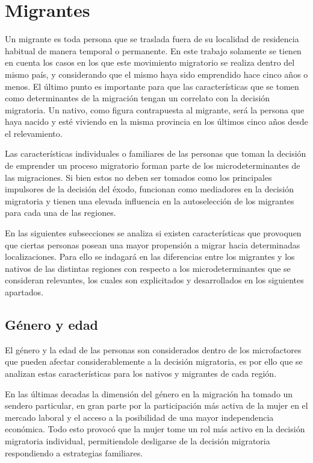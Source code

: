 \documentclass[12pt,a4paper]{article}
\begin{document}
\section{Migrantes}
Un migrante es toda persona que se traslada fuera de su localidad de residencia habitual de manera temporal o permanente. En este trabajo solamente se tienen en cuenta los casos en los que este movimiento migratorio se realiza dentro del mismo país, y considerando que el mismo haya sido emprendido hace cinco años o menos. El último punto es importante para que las características que se tomen como determinantes de la migración tengan un correlato con la decisión migratoria. Un nativo, como figura contrapuesta al migrante, será la persona que haya nacido y esté viviendo en la misma provincia en los últimos cinco años desde el relevamiento.

Las características individuales o familiares de las personas que toman la decisión de emprender un proceso migratorio forman parte de los microdeterminantes de las migraciones. Si bien estos no deben ser tomados como los principales impulsores de la decisión del éxodo, funcionan como mediadores en la decisión migratoria y tienen una elevada influencia en la autoselección de los migrantes para cada una de las regiones.

En las siguientes subsecciones se analiza si existen características que provoquen que ciertas personas posean una mayor propensión a migrar hacia determinadas localizaciones. Para ello se indagará en las diferencias entre los migrantes y los nativos de las distintas regiones con respecto a los microdeterminantes que se consideran relevantes, los cuales son explicitados y desarrollados en los siguientes apartados.


\subsection{Género y edad}
El género y la edad de las personas son considerados dentro de los microfactores que pueden afectar considerablemente a la decisión migratoria, es por ello que se analizan estas características para los nativos y migrantes de cada región.

En las últimas decadas la dimensión del género en la migración ha tomado un sendero particular, en gran parte por la participación más activa de la mujer en el mercado laboral y el acceso a la posibilidad de una mayor independencia económica. Todo esto provocó que la mujer tome un rol más activo en la decisión migratoria individual, permitiendole desligarse de la decisión migratoria respondiendo a estrategias  familiares.
\end{document}
